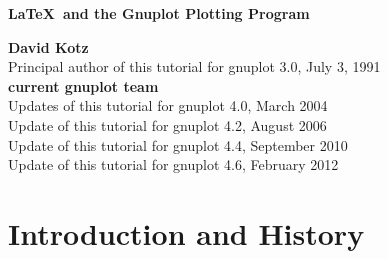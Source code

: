 %
%
%
%
%







\begin{titlepage}

\begin{center}
{\Large \bf \LaTeX\ and the Gnuplot Plotting Program}

\vskip2cm

{\bf David Kotz} \\[0.4cm]
Principal author of this tutorial for gnuplot 3.0, July 3, 1991 \\[1.0cm]

{\bf current gnuplot team} \\[0.4cm]
Updates of this tutorial for gnuplot 4.0, March 2004 \\
Update of this tutorial for gnuplot 4.2, August 2006 \\
Update of this tutorial for gnuplot 4.4, September 2010 \\
Update of this tutorial for gnuplot 4.6, February 2012

\vskip2cm


\end{center}

\vfil
\vfil
\tableofcontents
\vfil

\end{titlepage}


\pagestyle{myheadings}

\currentspace %

\section{Introduction and History}

